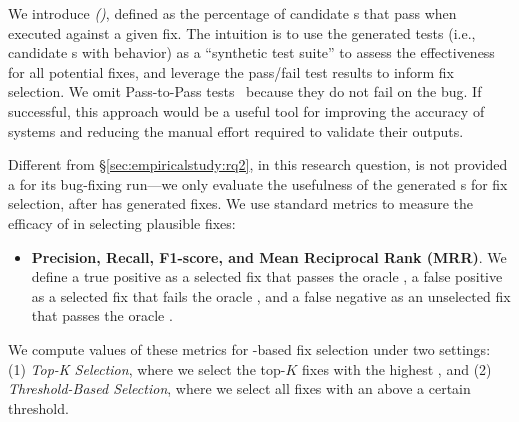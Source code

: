 \newcommand{\passtopass}{$P \rightarrow P$\xspace}

We introduce \emph{\enpassratefull (\enpassrate)}, defined as the percentage of candidate \brt{}s that pass when executed against a given fix. 
The intuition is to use the generated tests (i.e., candidate \brt{}s with \failtoany behavior) as a ``synthetic test suite'' to assess the effectiveness for all potential fixes, and leverage the pass/fail test results to inform fix selection.
We omit Pass-to-Pass tests~\cite{mundler2024swt} because they do not fail on the bug.
If successful, this approach would be a useful tool for improving the accuracy of \autopr systems and reducing the manual effort required to validate their outputs.


Different from \S\ref{sec:empiricalstudy:rq2}, in this research question, \passerine is not provided a \brt for its bug-fixing run---we only evaluate the usefulness of the generated \brt{}s for fix selection, after \passerine has generated fixes.
We use standard \irfull metrics to measure the efficacy of \enpassrate in selecting plausible fixes: 

\begin{itemize}
    \item \textbf{Precision, Recall, F1-score, and Mean Reciprocal Rank (MRR)}.
    We define a true positive as a selected fix that passes the oracle \brt, a false positive as a selected fix that fails the oracle \brt, and a false negative as an unselected fix that passes the oracle \brt. 
\end{itemize}

We compute values of these metrics for \enpassrate-based fix selection under two settings: (1) \textit{Top-K Selection}, where we select the top-$K$ fixes with the highest \enpassrate, and (2) \textit{Threshold-Based Selection}, where we select all fixes with an \enpassrate above a certain threshold.

